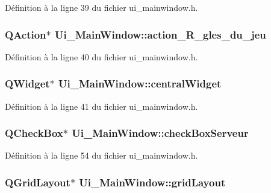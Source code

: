 Définition à la ligne 39 du fichier ui\-\_\-mainwindow.\-h.

\hypertarget{class_ui___main_window_abe63bbd9a48e3e688fefab2ef89605c0}{
\subsubsection[{action\-\_\-\-R\-\_\-gles\-\_\-du\-\_\-jeu}]{\setlength{\rightskip}{0pt plus 5cm}Q\-Action$\ast$ Ui\-\_\-\-Main\-Window\-::action\-\_\-\-R\-\_\-gles\-\_\-du\-\_\-jeu}}\label{class_ui___main_window_abe63bbd9a48e3e688fefab2ef89605c0}


Définition à la ligne 40 du fichier ui\-\_\-mainwindow.\-h.

\hypertarget{class_ui___main_window_a30075506c2116c3ed4ff25e07ae75f81}{
\subsubsection[{central\-Widget}]{\setlength{\rightskip}{0pt plus 5cm}Q\-Widget$\ast$ Ui\-\_\-\-Main\-Window\-::central\-Widget}}\label{class_ui___main_window_a30075506c2116c3ed4ff25e07ae75f81}


Définition à la ligne 41 du fichier ui\-\_\-mainwindow.\-h.

\hypertarget{class_ui___main_window_a49a1c4dfac38d9cc35bcff6f58f17a47}{
\subsubsection[{check\-Box\-Serveur}]{\setlength{\rightskip}{0pt plus 5cm}Q\-Check\-Box$\ast$ Ui\-\_\-\-Main\-Window\-::check\-Box\-Serveur}}\label{class_ui___main_window_a49a1c4dfac38d9cc35bcff6f58f17a47}


Définition à la ligne 54 du fichier ui\-\_\-mainwindow.\-h.

\hypertarget{class_ui___main_window_a525ed3c5fe0784ac502ee222fba4e205}{
\subsubsection[{grid\-Layout}]{\setlength{\rightskip}{0pt plus 5cm}Q\-Grid\-Layout$\ast$ Ui\-\_\-\-Main\-Window\-::grid\-Layout}}\label{class_ui___main_window_a525ed3c5fe0784ac502ee222fba4e205}


